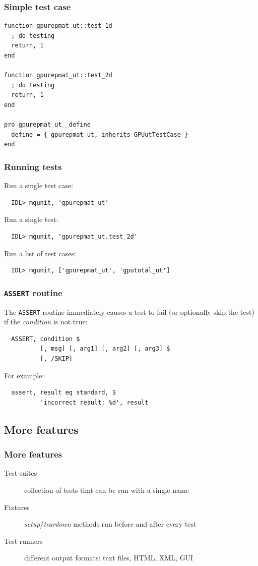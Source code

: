 \documentclass[12pt, handout]{beamer}
\begin{document}
\begin{frame}[t, fragile]
  \frametitle{Simple test case}

\begin{lstlisting}[basicstyle=\ttfamily\fontsize{10pt}{10pt}\selectfont]
function gpurepmat_ut::test_1d
  ; do testing
  return, 1
end

function gpurepmat_ut::test_2d
  ; do testing
  return, 1
end

pro gpurepmat_ut__define
  define = { gpurepmat_ut, inherits GPUutTestCase }
end
\end{lstlisting}

\end{frame}


\begin{frame}[t, fragile]
  \frametitle{Running tests}

Run a single test case:
\begin{lstlisting}
  IDL> mgunit, 'gpurepmat_ut'
\end{lstlisting}
Run a single test:
\begin{lstlisting}
  IDL> mgunit, 'gpurepmat_ut.test_2d'
\end{lstlisting}
Run a list of test cases:
\begin{lstlisting}
  IDL> mgunit, ['gpurepmat_ut', 'gputotal_ut']
\end{lstlisting}

\end{frame}

\begin{frame}[t, fragile]
  \frametitle{{\tt ASSERT} routine}

The {\tt ASSERT} routine immediately causes a test to fail (or optionally skip the test) if the {\em condition} is not true:
\begin{lstlisting}
  ASSERT, condition $
          [, msg] [, arg1] [, arg2] [, arg3] $
          [, /SKIP]
\end{lstlisting}
For example:
\begin{lstlisting}
  assert, result eq standard, $
          'incorrect result: %d', result
\end{lstlisting}

\end{frame}

\subsection{More features}

\begin{frame}[t, fragile]
  \frametitle{More features}
  \begin{description}
    \item[Test suites] collection of tests that can be run with a single name
    \item[Fixtures] {\em setup}/{\em teardown} methods run before and after every test
    \item[Test runners] different output formats: text files, HTML, XML, GUI
  \end{description}
\end{frame}
\end{document}
